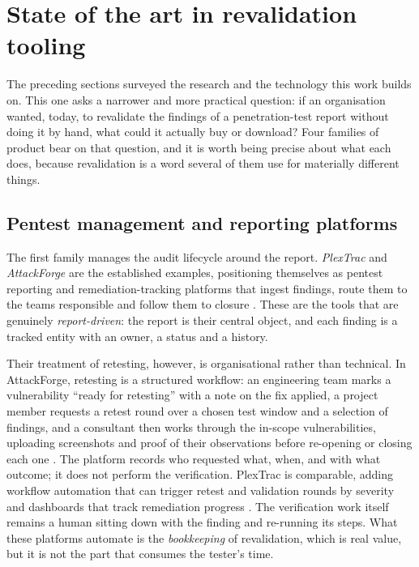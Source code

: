 \section{State of the art in revalidation tooling}
\label{sec:sota}

The preceding sections surveyed the research and the technology this work builds on.
This one asks a narrower and more practical question: if an organisation wanted, today,
to revalidate the findings of a penetration-test report without doing it by hand, what
could it actually buy or download? Four families of product bear on that question, and
it is worth being precise about what each does, because revalidation is a word several
of them use for materially different things.

\subsection{Pentest management and reporting platforms}
\label{subsec:sota-management}

The first family manages the audit lifecycle around the report. \emph{PlexTrac} and
\emph{AttackForge} are the established examples, positioning themselves as pentest
reporting and remediation-tracking platforms that ingest findings, route them to the
teams responsible and follow them to closure \cite{plextrac, attackforge}. These are
the tools that are genuinely \emph{report-driven}: the report is their central object,
and each finding is a tracked entity with an owner, a status and a history.

Their treatment of retesting, however, is organisational rather than technical. In
AttackForge, retesting is a structured workflow: an engineering team marks a
vulnerability ``ready for retesting'' with a note on the fix applied, a project member
requests a retest round over a chosen test window and a selection of findings, and a
consultant then works through the in-scope vulnerabilities, uploading screenshots and
proof of their observations before re-opening or closing each one \cite{attackforge}.
The platform records who requested what, when, and with what outcome; it does not
perform the verification. PlexTrac is comparable, adding workflow automation that can
trigger retest and validation rounds by severity and dashboards that track remediation
progress \cite{plextrac}. The verification work itself remains a human sitting down
with the finding and re-running its steps. What these platforms automate is the
\emph{bookkeeping} of revalidation, which is real value, but it is not the part that
consumes the tester's time.

